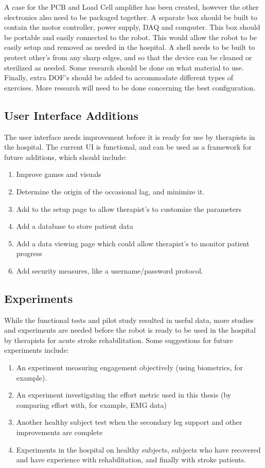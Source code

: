 \documentclass[12pt]{report}
\begin{document}
	A case for the PCB and Load Cell amplifier has been created, however the other electronics also need to be packaged together. A separate box should be built to contain the motor controller, power supply, DAQ and computer. This box should be portable and easily connected to the robot. This would allow the robot to be easily setup and removed as needed in the hospital. A shell needs to be built to protect other's from any sharp edges, and so that the device can be cleaned or sterilized as needed. Some research should be done on what material to use. Finally, extra DOF's should be added to accommodate different types of exercises. More research will need to be done concerning the best configuration. 
	
	\subsection{User Interface Additions}
	
The user interface needs improvement before it is ready for use by therapists in the hospital. The current UI is functional, and can be used as a framework for future additions, which should include: 	
	
	\begin{enumerate}
		\item Improve games and visuals
		\item Determine the origin of the occasional lag, and minimize it.
		\item Add to the setup page to allow therapist's to customize the parameters
		\item Add a database to store patient data
		\item Add a data viewing page which could allow therapist's to monitor patient progress
		\item Add security measures, like a username/password protocol.  
	\end{enumerate}
	
	\subsection{Experiments}
	
	While the functional tests and pilot study resulted in useful data, more studies and experiments are needed before the robot is ready to be used in the hospital by therapists for acute stroke rehabilitation. Some suggestions for future experiments include: 
	
	\begin{enumerate}
		\item An experiment measuring engagement objectively (using biometrics, for example).
		\item An experiment investigating the effort metric used in this thesis (by comparing effort with, for example, EMG data)
		\item Another healthy subject test when the secondary leg support and other improvements are complete
		\item Experiments in the hospital on healthy subjects, subjects who have recovered and have experience with rehabilitation, and finally with stroke patients.
	\end{enumerate}
	
\end{document}
